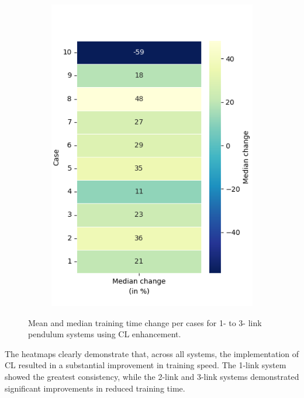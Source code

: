 \begin{figure}[h!]
\begin{subfigure}[t]{0.32\textwidth}
		\includegraphics[width=\textwidth]{Figures/TP_median_heatmap_percentage.png}
		\label{fig: TP_median}
		\caption{}
	\end{subfigure}
	
	\caption{Mean and median training time change per cases for 1- to 3- link pendulum systems using CL enhancement.}
	\label{fig: percentage heatmaps for 1- to 3- link systems using CL}
\end{figure}

The heatmaps clearly demonstrate that, across all systems, the implementation of CL resulted in a substantial improvement in training speed. The 1-link system showed the greatest consistency, while the 2-link and 3-link systems demonstrated significant improvements in reduced training time.

